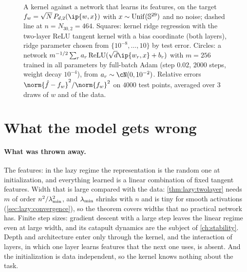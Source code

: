 \begin{refsection}
\begin{figure}[t]
\centering
{}
\caption{A kernel against a network that learns its features, on the target $f_w=\sqrt N\,P_{d,2}(\ip{w,x})$ with $x\sim\operatorname{Unif}(\mathbb{S}^{29})$ and no noise; dashed line at $n=N_{30,2}=464$. Squares: kernel ridge regression with the two-layer ReLU tangent kernel with a bias coordinate (both layers), ridge parameter chosen from $\{10^{-8},\dots,10\}$ by test error. Circles: a network $m^{-1/2}\sum_ra_r\relu(\sqrt d\ip{w_r,x}+b_r)$ with $m=256$ trained in all parameters by full-batch Adam (step $0.02$, $2000$ steps, weight decay $10^{-4}$), from $a_r\sim\cN(0,10^{-2})$. Relative errors $\norm{\hat f-f_w}^2/\norm{f_w}^2$ on $4000$ test points, averaged over $3$ draws of $w$ and of the data.}
\label{fig:lazy:gap}
\end{figure}

\section{What the model gets wrong}\label{sec:lazy:wrong}

\paragraph{What was thrown away.} The features: in the lazy regime the representation is the random one at initialization, and everything learned is a linear combination of fixed tangent features. Width that is large compared with the data: \cref{thm:lazy:twolayer} needs $m$ of order $n^2/\lambda_{\min}^2$, and $\lambda_{\min}$ shrinks with $n$ and is tiny for smooth activations (\cref{sec:lazy:convergence}), so the theorem covers widths that no practical network has. Finite step sizes: gradient descent with a large step leaves the linear regime even at large width, and its catapult dynamics are the subject of \cref{ch:stability}. Depth and architecture enter only through the kernel, and the interaction of layers, in which one layer learns features that the next one uses, is absent. And the initialization is data independent, so the kernel knows nothing about the task.


\end{refsection}
